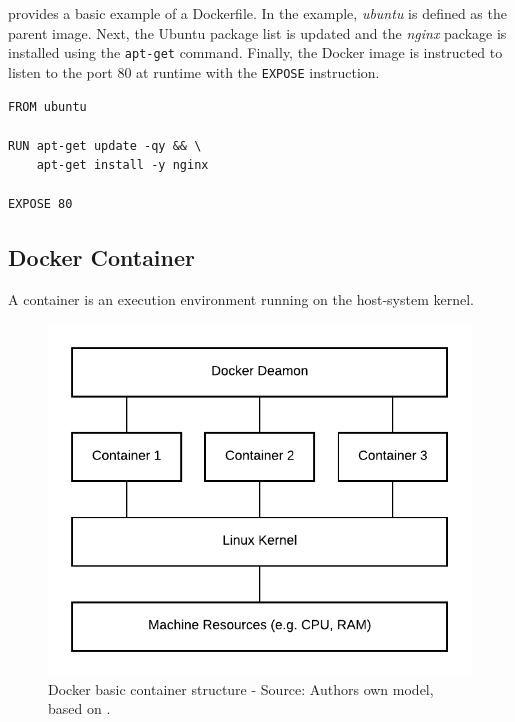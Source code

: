  provides a basic example of a Dockerfile.
In the example, \textit{ubuntu} is defined as the parent image.
Next, the Ubuntu package list is updated and the \textit{nginx} package is installed using the \texttt{apt-get} command.
Finally, the Docker image is instructed to listen to the port 80 at runtime with the \texttt{EXPOSE} instruction.

\begin{lstlisting}[label=lst:04_docker_image_dockerfile, caption=Basic example of a Dockerfile]
FROM ubuntu

RUN apt-get update -qy && \
    apt-get install -y nginx

EXPOSE 80
\end{lstlisting}


\subsection{Docker Container}
A container is an execution environment running on the host-system kernel.

\begin{figure}[h]
\centering
\includegraphics[scale=1]{images/04_technical_background/docker/container_structure}
\caption{Docker basic container structure - Source: Authors own model, based on \cite{Bullington2020Docker}.}
\label{fig:04_docker_container_container-structure}
\end{figure}

